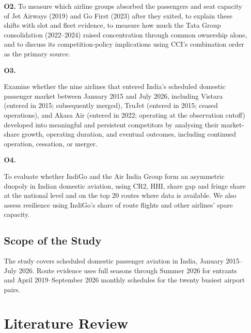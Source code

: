 \documentclass[12pt,a4paper]{article}
\newenvironment{authorcontribution}[1]{\par\begingroup\color{#1}}{\par\endgroup}
\begin{document}
\begin{authorcontribution}{authorMeena}
{\hypertarget{objective:2}{\textbf{O2.}} To measure which airline groups absorbed the passengers and seat capacity of Jet Airways (2019) and Go First (2023) after they exited, to explain these shifts with slot and fleet evidence, to measure how much the Tata Group consolidation (2022–2024) raised concentration through common ownership alone, and to discuss its competition-policy implications using CCI’s combination order as the primary source.}
\par
\end{authorcontribution}

\begin{authorcontribution}{authorSweta}
\hypertarget{objective:3}{\textbf{O3.}} Examine whether the nine airlines that entered India’s scheduled domestic passenger market between January 2015 and July 2026, including Vistara (entered in 2015; subsequently merged), TruJet (entered in 2015; ceased operations), and Akasa Air (entered in 2022; operating at the observation cutoff) developed into meaningful and persistent competitors by analysing their market-share growth, operating duration, and eventual outcomes, including continued operation, cessation, or merger.
\par
\end{authorcontribution}

\begin{authorcontribution}{authorGoutham}
\hypertarget{objective:4}{\textbf{O4.}} To evaluate whether IndiGo and the Air India Group form an asymmetric duopoly in Indian domestic aviation, using CR2, HHI, share gap and fringe share at the national level and on the top 20 routes where data is available. We also assess resilience using IndiGo's share of route flights and other airlines' spare capacity.
\par
\end{authorcontribution}

\subsection{Scope of the Study}
The study covers scheduled domestic passenger aviation in India, January 2015--July 2026. Route evidence uses full seasons through Summer 2026 for entrants and April 2019--September 2026 monthly schedules for the twenty busiest airport pairs.

\section{Literature Review}
\end{document}
